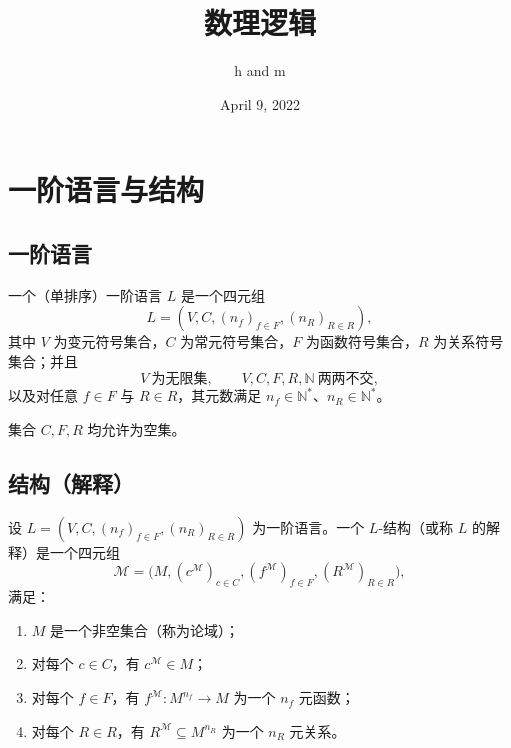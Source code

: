 \documentclass[lang=cn,a4paper,newtx,section]{elegantbook}
\title{数理逻辑}
\author{h and m}
\date{April 9, 2022}
\begin{document}
\maketitle
\frontmatter

\tableofcontents

\mainmatter

\chapter{一阶语言与结构}

\section{一阶语言}

\begin{definition}[一阶语言]
一个（单排序）一阶语言 $L$ 是一个四元组
\[
  L=(V,C,(n_f)_{f\in F},(n_R)_{R\in R}),
\]
其中 $V$ 为变元符号集合，$C$ 为常元符号集合，$F$ 为函数符号集合，$R$ 为关系符号集合；并且
\[
  V\ \text{为无限集},\qquad V,C,F,R,\mathbb N\ \text{两两不交},
\]
以及对任意 $f\in F$ 与 $R\in R$，其元数满足 $n_f\in\mathbb N^{*}$、$n_R\in\mathbb N^{*}$。
\end{definition}

\begin{remark}
集合 $C,F,R$ 均允许为空集。
\end{remark}

\section{结构（解释）}

\begin{definition}[$L$-结构]
设 $L=(V,C,(n_f)_{f\in F},(n_R)_{R\in R})$ 为一阶语言。一个 $L$-结构（或称 $L$ 的解释）是一个四元组
\[
  \mathcal M=\bigl(M,(c^{\mathcal M})_{c\in C},(f^{\mathcal M})_{f\in F},(R^{\mathcal M})_{R\in R}\bigr),
\]
满足：
\begin{enumerate}
  \item $M$ 是一个非空集合（称为论域）；
  \item 对每个 $c\in C$，有 $c^{\mathcal M}\in M$；
  \item 对每个 $f\in F$，有 $f^{\mathcal M}:M^{n_f}\to M$ 为一个 $n_f$ 元函数；
  \item 对每个 $R\in R$，有 $R^{\mathcal M}\subseteq M^{n_R}$ 为一个 $n_R$ 元关系。
\end{enumerate}
\end{definition}
\end{document}
